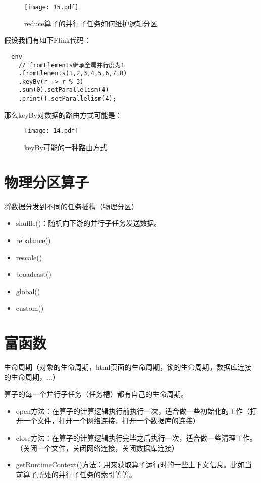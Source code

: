 \documentclass[cn,11pt,chinese]{elegantbook}
\begin{document}
\begin{figure}[htbp]
  \centering
  \texttt{[image: 15.pdf]}
  \caption{reduce算子的并行子任务如何维护逻辑分区}
\end{figure}

假设我们有如下Flink代码：

\begin{lstlisting}
  env
    // fromElements继承全局并行度为1
    .fromElements(1,2,3,4,5,6,7,8)
    .keyBy(r -> r % 3)
    .sum(0).setParallelism(4)
    .print().setParallelism(4);
\end{lstlisting}

那么keyBy对数据的路由方式可能是：

\begin{figure}[htbp]
  \centering
  \texttt{[image: 14.pdf]}
  \caption{keyBy可能的一种路由方式}
\end{figure}

\section{物理分区算子}

将数据分发到不同的任务插槽（物理分区）

\begin{itemize}
  \item shuffle()：随机向下游的并行子任务发送数据。
  \item rebalance()
  \item rescale()
  \item broadcast()
  \item global()
  \item custom()
\end{itemize}

\section{富函数}

生命周期（对象的生命周期，html页面的生命周期，锁的生命周期，数据库连接的生命周期，...）

算子的每一个并行子任务（任务槽）都有自己的生命周期。

\begin{itemize}
  \item open方法：在算子的计算逻辑执行前执行一次，适合做一些初始化的工作（打开一个文件，打开一个网络连接，打开一个数据库的连接）
  \item close方法：在算子的计算逻辑执行完毕之后执行一次，适合做一些清理工作。（关闭一个文件，关闭网络连接，关闭数据库连接）
  \item getRuntimeContext()方法：用来获取算子运行时的一些上下文信息。比如当前算子所处的并行子任务的索引等等。
\end{itemize}
\end{document}

